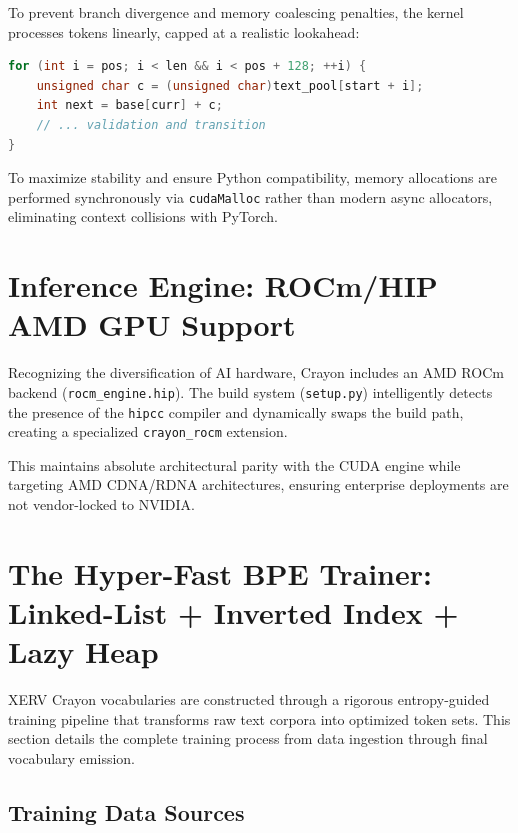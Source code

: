 \documentclass[11pt,a4paper,twocolumn]{article}
\begin{document}
To prevent branch divergence and memory coalescing penalties, the kernel processes tokens linearly, capped at a realistic lookahead:

\begin{lstlisting}[language=C++,caption=CUDA Kernel Logic]
for (int i = pos; i < len && i < pos + 128; ++i) {
    unsigned char c = (unsigned char)text_pool[start + i];
    int next = base[curr] + c;
    // ... validation and transition
}
\end{lstlisting}

To maximize stability and ensure Python compatibility, memory allocations are performed synchronously via \texttt{cudaMalloc} rather than modern async allocators, eliminating context collisions with PyTorch.

\section{Inference Engine: ROCm/HIP AMD GPU Support}
\label{sec:rocm_engine}

Recognizing the diversification of AI hardware, Crayon includes an AMD ROCm backend (\texttt{rocm\_engine.hip}). The build system (\texttt{setup.py}) intelligently detects the presence of the \texttt{hipcc} compiler and dynamically swaps the build path, creating a specialized \texttt{crayon\_rocm} extension.

This maintains absolute architectural parity with the CUDA engine while targeting AMD CDNA/RDNA architectures, ensuring enterprise deployments are not vendor-locked to NVIDIA.

\section{The Hyper-Fast BPE Trainer: Linked-List + Inverted Index + Lazy Heap}
\label{sec:training}

XERV Crayon vocabularies are constructed through a rigorous entropy-guided training pipeline that transforms raw text corpora into optimized token sets. This section details the complete training process from data ingestion through final vocabulary emission.

\subsection{Training Data Sources}
\end{document}

